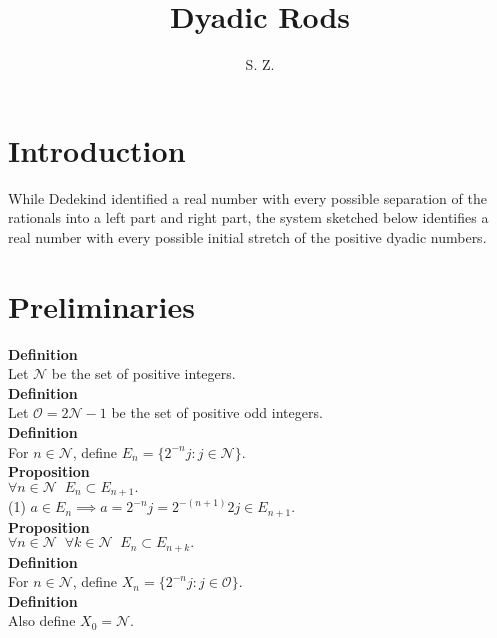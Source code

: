 \documentclass{article}
\title{\textbf{Dyadic Rods}}
\author{S. Z. }
\newcommand{\odds}{ \mathscr{O}}
\newcommand{\disjoints}{ X}
\newcommand{\nondisjoints}{E}
\newcommand{\naturals}{ \mathscr{N}}
\newcommand{\elt}{a}
\newcommand{\odds}{ \mathscr{O}}
\begin{document}
\maketitle

\section{Introduction}
While Dedekind identified a real number with every possible separation of the rationals into a left part and right part, the system sketched below identifies a real number with every possible initial stretch of the positive dyadic numbers. \\

\section{Preliminaries}


\textbf{Definition}\\
Let $\naturals $ be the set of positive integers.\\

\textbf{Definition}\\
Let $\odds = 2\naturals - 1 $ be the set of positive odd integers.\\

\textbf{Definition}\\
For $n \in \naturals$, define  $\nondisjoints_n = \{ 2^{-n}j : j \in \naturals \}$. \\

\textbf{Proposition}\\
$\forall n \in \naturals \;\; \nondisjoints_n \subset \nondisjoints_{n+1}.$\\

(1) $\elt \in \nondisjoints_n \implies \elt = 2^{-n}j = 2^{-(n+1)}2j \in \nondisjoints_{n+1}$.\\

\textbf{Proposition}\\
$\forall n \in \naturals \;\; \forall k \in \naturals \;\; \nondisjoints_n \subset \nondisjoints_{n+k}.$\\

\textbf{Definition}\\
For  $n \in \naturals$, define $\disjoints_n = \{2^{-n} j : j \in \odds \}$.\\

\textbf{Definition}\\
Also define $\disjoints_0 = \naturals$.\\
\end{document}
